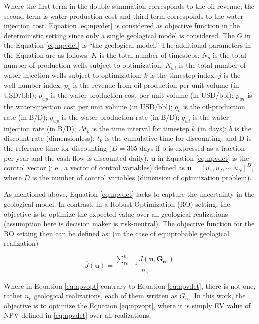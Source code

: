 \documentclass[]{elsarticle} %
\begin{document}
Where the first term in the double summation corresponds to the oil revenue; the second term is water-production cost and third term corresponds to the water-injection cost. Equation \eqref{eq:npvdet} is considered as objective function in the deterministic setting since only a single geological model is considered. The \(G\) in the Equation \eqref{eq:npvdet} is ``the geological model.'' The additional parameters in the Equation are as follows: \(K\) is the total number of timesteps; \(N_p\) is the total number of production wells subject to optimization; \(N_{wi}\) is the total number of water-injection wells subject to optimization; \(k\) is the timestep index; \(j\) is the well-number index; \(p_o\) is the revenue from oil production per unit volume (in USD/bbl); \(p_{wp}\) is the water-production cost per unit volume (in USD/bbl); \(p_{wi}\) is the water-injection cost per unit volume (in USD/bbl); \(q_o\) is the oil-production rate (in B/D); \(q_{wp}\) is the water-production rate (in B/D); \(q_{wi}\) is the water-injection rate (in B/D); \(\Delta t_k\) is the time interval for timestep \(k\) (in days); \(b\) is the discount rate (dimensionless); \(t_k\) is the cumulative time for discounting; and D is the reference time for discounting (\(D = 365\) days if b is expressed as a fraction per year and the cash flow is discounted daily). \(\mathbf{u}\) in Equation \eqref{eq:npvdet} is the control vector (i.e., a vector of control variables) defined as \(\mathbf{u} = [u_1, u_2, \cdots, u_N]^D\), where \(D\) is the number of control variables (dimension of optimization problem).

As mentioned above, Equation \eqref{eq:npvdet} lacks to capture the uncertainty in the geological model. In contrast, in a Robust Optimization (RO) setting, the objective is to optimize the expected value over all geological realizations (assumption here is decision maker is risk-neutral). The objective function for the RO setting then can be defined as: (in the case of equiprobable geological realization)

\begin{equation}
\overline{J}(\mathbf{u}) = \frac{\sum_{re=1}^{n_e} J(\mathbf{u,G_{re}})}{n_e}
\label{eq:npvopt}
\end{equation}

Where in Equation \eqref{eq:npvopt} contrary to Equation \eqref{eq:npvdet}, there is not one, rather \(n_e\) geological realizations, each of them written as \(G_{re}\). In this work, the objective is to optimize the Equation \eqref{eq:npvopt}, where it is simply EV value of NPV defined in \eqref{eq:npvdet} over all realizations.\\
\end{document}
